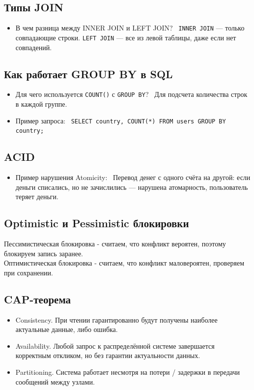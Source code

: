 \documentclass[a4paper,14pt]{article}
\begin{document}
\subsection{Типы JOIN}

\begin{itemize}
\item В чем разница между INNER JOIN и LEFT JOIN? \
\texttt{INNER JOIN} — только совпадающие строки.
\texttt{LEFT JOIN} — все из левой таблицы, даже если нет совпадений.
\end{itemize}

\subsection{Как работает GROUP BY в SQL}

\begin{itemize}
\item Для чего используется \texttt{COUNT()} с \texttt{GROUP BY}? \
Для подсчета количества строк в каждой группе.

\item Пример запроса: \
\texttt{SELECT country, COUNT(*) FROM users GROUP BY country;}
\end{itemize}

\subsection{ACID}

\begin{itemize}
\item Пример нарушения Atomicity: \
Перевод денег с одного счёта на другой: если деньги списались, но не зачислились — нарушена атомарность, пользователь теряет деньги.
\end{itemize}

\subsection{Optimistic и Pessimistic блокировки}
Пессимистическая блокировка - считаем, что конфликт вероятен, поэтому блокируем запись заранее. \\
Оптимистическая блокировка - считаем, что конфликт маловероятен, проверяем при сохранении.

\subsection{CAP-теорема}
\begin{itemize}
    \item Consistency. При чтении гарантированно будут
    получены наиболее актуальные данные, либо ошибка.
    \item Availability. Любой запрос к распределённой системе
    завершается корректным откликом, но без гарантии
    актуальности данных.
    \item Partitioning. Система работает несмотря на потери /
    задержки в передачи сообщений между узлами.
\end{itemize}
\end{document}
